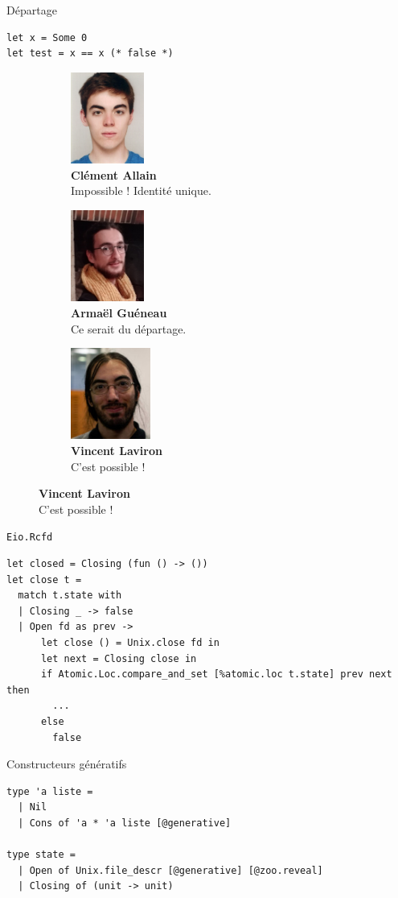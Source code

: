 \begin{frame}[fragile]{Départage}
\Large
\begin{verbatim}
let x = Some 0
let test = x == x (* false *)
\end{verbatim}
\vfill
\begin{figure}
  \captionsetup{justification=centering}
  \begin{subfigure}[b]{0.3\textwidth}
    \centering
    \includegraphics[height=3cm]{images/clement_allain.jpg}
    \caption*{\footnotesize \textbf{Clément Allain} \\ Impossible ! Identité unique.}
  \end{subfigure}
  \begin{subfigure}[b]{0.3\textwidth}
    \centering
    \includegraphics[height=3cm]{images/armael_gueneau.jpg}
    \caption*{\footnotesize \textbf{Armaël Guéneau} \\ Ce serait du départage.}
  \end{subfigure}
  \begin{subfigure}[b]{0.3\textwidth}
    \centering
    \includegraphics[height=3cm]{images/vincent_laviron.jpg}
    \caption*{\footnotesize \textbf{Vincent Laviron} \\ C'est possible !}
  \end{subfigure}
\end{figure}
\end{frame}

\begin{frame}[fragile]{\texttt{Eio.Rcfd}}
\begin{verbatim}
let closed = Closing (fun () -> ())
let close t =
  match t.state with
  | Closing _ -> false
  | Open fd as prev ->
      let close () = Unix.close fd in
      let next = Closing close in
      if Atomic.Loc.compare_and_set [%atomic.loc t.state] prev next then
        ...
      else
        false
\end{verbatim}
\end{frame}

\begin{frame}[fragile]{Constructeurs génératifs}
\Large
\begin{verbatim}
type 'a liste =
  | Nil
  | Cons of 'a * 'a liste [@generative]

type state =
  | Open of Unix.file_descr [@generative] [@zoo.reveal]
  | Closing of (unit -> unit)
\end{verbatim}
\end{frame}
